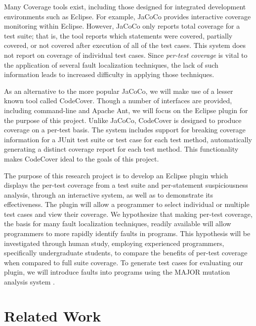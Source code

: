 \documentclass[11pt]{article}
\begin{document}
Many Coverage tools exist, including those designed for integrated development
environments such as Eclipse.  For example, JaCoCo provides interactive
coverage monitoring within Eclipse.  However, JaCoCo only reports total
coverage for a test suite; that is, the tool reports which statements
were covered, partially covered, or not covered after execution of all
of the test cases.  This system does not report on coverage of
individual test cases.  Since \emph{per-test coverage} is vital to the
application of several fault localization techniques, the lack of such
information leads to increased difficulty in applying those techniques.

As an alternative to the more popular JaCoCo, we will make use of a
lesser known tool called CodeCover.  Though a number of interfaces are
provided, including command-line and Apache Ant, we will focus on the
Eclipse plugin for the purpose of this project.  Unlike JaCoCo,
CodeCover is designed to produce coverage on a per-test basis.  The
system includes support for breaking coverage information for a JUnit 
test suite or test case for each test method, automatically generating
a distinct coverage report for each test method.  This functionality
makes CodeCover ideal to the goals of this project.

The purpose of this research project is to develop an Eclipse plugin
which displays the per-test coverage from a test suite and per-statement
suspiciousness analysis, through an interactive system, as well as to
demonstrate its effectiveness.  The plugin will allow a programmer to
select individual or multiple test cases and view their coverage.  We
hypothesize that making per-test coverage, the basis for many fault
localization techniques, readily available will allow programmers to
more rapidly identify faults in programs.  This hypothesis will be
investigated through human study, employing experienced programmers,
specifically undergraduate students, to compare
the benefits of per-test coverage when compared to full suite coverage.
To generate test cases for evaluating our plugin, we will introduce
faults into programs using the MAJOR mutation analysis system
\cite{major}.

\vspace*{-.1in}
\section{Related Work}
\label{sec:relatedwork}
\vspace*{-.1in}
\end{document}
